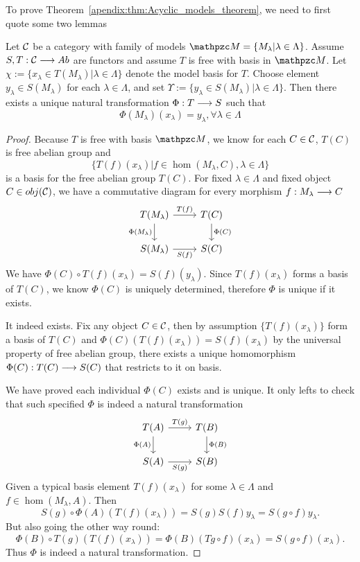 \documentclass[11pt]{book} %
\begin{document}
To prove Theorem~\ref{apendix:thm:Acyclic_models_theorem}, we need to first quote some two lemmas
\begin{lemma}\label{apendixA:lem:A.1.3}
Let ${\cal C}$ be a category with family of models $\pzm=\{M_\lambda|\lambda\in \Lambda\}$. Assume $S,T:{\cal C}\longrightarrow Ab$ are functors and assume $T$ is free with basis in $\pzm$. Let
$\chi:=\{x_\lambda\in T(M_\lambda)|\lambda\in \Lambda\}$ denote the model basis for $T$. Choose element $y_\lambda\in S(M_\lambda)$ for each $\lambda\in \Lambda$, and set $\Upsilon:=\{y_\lambda\in S(M_\lambda)|\lambda\in\Lambda\}$. Then there exists a unique natural transformation $\Phi:T\longrightarrow S$ such that 
$$
\Phi(M_\lambda)(x_\lambda)=y_\lambda,\forall \lambda\in \Lambda
$$
\end{lemma}
\begin{proof}
Because $T$ is free with basis $\pzm$, we know for each $C\in{\cal C}$, $T(C)$ is free abelian group and
$$
\{T(f)(x_\lambda)|f\in \hom(M_\lambda,C), \lambda\in \Lambda\}
$$
is a basis for the free abelian group $T(C)$. For fixed $\lambda\in \Lambda$ and fixed object $C\in obj({\cal C})$, we have a commutative diagram for every morphism $f: M_\lambda\longrightarrow C$
\[
\begin{tikzcd}
T(M_\lambda) \arrow[r, "T(f)"] \arrow[d, "\Phi(M_\lambda)"'] & T(C) \arrow[d, "\Phi(C)"] \\
S(M_\lambda) \arrow[r, "S(f)"'] & S(C)
\end{tikzcd}
\]
We have $\Phi(C)\circ T(f)(x_\lambda)=S(f)(y_\lambda)$. Since $T(f)(x_\lambda)$ forms a basis of $T(C)$, we know $\Phi(C)$ is uniquely determined, therefore $\Phi$ is unique if it exists.

It indeed exists. Fix any object $C\in {\cal C}$, then by assumption $\{T(f)(x_\lambda)\}$ form a basis of $T(C)$ and $\Phi(C)(T(f)(x_\lambda))=S(f)(x_\lambda)$ by the universal property of free abelian group, there exists a unique homomorphism $\Phi(C):T(C)\longrightarrow S(C)$ that restricts to it on basis. 

We have proved each individual $\Phi(C)$ exists and is unique. It only lefts to check that such specified $\Phi$ is indeed a natural transformation
\[
\begin{tikzcd}
T(A) \arrow[r, "T(g)"] \arrow[d, "\Phi(A)"'] & T(B) \arrow[d, "\Phi(B)"] \\
S(A) \arrow[r, "S(g)"'] & S(B)
\end{tikzcd}
\]
Given a typical basis element $T(f)(x_\lambda)$ for some $\lambda\in \Lambda$ and $f\in \hom(M_\lambda,A)$. Then 
$$
S(g)\circ \Phi(A)(T(f)(x_\lambda))=S(g)S(f)y_\lambda=S(g\circ f) y_\lambda.
$$
But also going the other way round:
$$
\Phi(B)\circ T(g) (T(f)(x_\lambda))=\Phi(B)(Tg\circ f)(x_\lambda)=S(g\circ f)(x_\lambda).
$$
Thus  $\Phi$ is indeed a natural transformation.
\end{proof}
\end{document}
